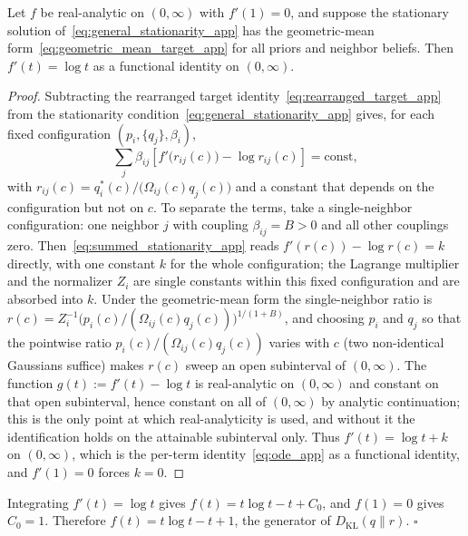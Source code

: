 \begin{lemma}
\label{lem:richness_app}
Let $f$ be real-analytic on $(0, \infty)$ with $f'(1) = 0$, and suppose the stationary solution of~\eqref{eq:general_stationarity_app} has the geometric-mean form~\eqref{eq:geometric_mean_target_app} for all priors and neighbor beliefs. Then $f'(t) = \log t$ as a functional identity on $(0, \infty)$.
\end{lemma}

\begin{proof}
Subtracting the rearranged target identity~\eqref{eq:rearranged_target_app} from the stationarity condition~\eqref{eq:general_stationarity_app} gives, for each fixed configuration $(p_i, \{q_j\}, \beta_i)$,
\begin{equation}
\sum_j \beta_{ij}\left[f'\big(r_{ij}(c)\big) - \log r_{ij}(c)\right] = \text{const},
\label{eq:summed_stationarity_app}
\end{equation}
with $r_{ij}(c) = q_i^*(c)/\big(\Omega_{ij}(c)q_j(c)\big)$ and a constant that depends on the configuration but not on $c$. To separate the terms, take a single-neighbor configuration: one neighbor $j$ with coupling $\beta_{ij} = B > 0$ and all other couplings zero. Then~\eqref{eq:summed_stationarity_app} reads $f'(r(c)) - \log r(c) = k$ directly, with one constant $k$ for the whole configuration; the Lagrange multiplier and the normalizer $Z_i$ are single constants within this fixed configuration and are absorbed into $k$. Under the geometric-mean form the single-neighbor ratio is $r(c) = Z_i^{-1}\big(p_i(c)/(\Omega_{ij}(c)q_j(c))\big)^{1/(1+B)}$, and choosing $p_i$ and $q_j$ so that the pointwise ratio $p_i(c)/(\Omega_{ij}(c)q_j(c))$ varies with $c$ (two non-identical Gaussians suffice) makes $r(c)$ sweep an open subinterval of $(0, \infty)$. The function $g(t) := f'(t) - \log t$ is real-analytic on $(0, \infty)$ and constant on that open subinterval, hence constant on all of $(0, \infty)$ by analytic continuation; this is the only point at which real-analyticity is used, and without it the identification holds on the attainable subinterval only. Thus $f'(t) = \log t + k$ on $(0, \infty)$, which is the per-term identity~\eqref{eq:ode_app} as a functional identity, and $f'(1) = 0$ forces $k = 0$.
\end{proof}

Integrating $f'(t) = \log t$ gives $f(t) = t\log t - t + C_0$, and $f(1)=0$ gives $C_0 = 1$. Therefore $f(t) = t\log t - t + 1$, the generator of $D_{\mathrm{KL}}(q\|r)$. \hfill $\square$

